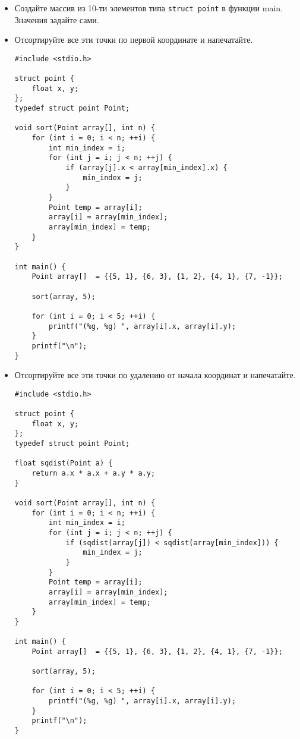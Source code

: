 \documentclass{article}
\begin{document}
\begin{itemize}
\begin{itemize}
\end{itemize}
\item Создайте массив из 10-ти элементов типа \texttt{struct point} в функции main. Значения задайте сами.

\newpage
\item Отсортируйте все эти точки по первой координате и напечатайте.
\begin{lstlisting}[backgroundcolor = \color{solcolor}]
#include <stdio.h>

struct point {
    float x, y;
};
typedef struct point Point;

void sort(Point array[], int n) {
    for (int i = 0; i < n; ++i) {
        int min_index = i;
        for (int j = i; j < n; ++j) {
            if (array[j].x < array[min_index].x) {
                min_index = j;
            }
        }
        Point temp = array[i];
        array[i] = array[min_index];
        array[min_index] = temp;
    }
}

int main() {
    Point array[]  = {{5, 1}, {6, 3}, {1, 2}, {4, 1}, {7, -1}};
    
    sort(array, 5);
    
    for (int i = 0; i < 5; ++i) {
        printf("(%g, %g) ", array[i].x, array[i].y);
    }
    printf("\n");
}
\end{lstlisting}

\newpage
\item Отсортируйте все эти точки по удалению от начала координат и напечатайте.
\begin{lstlisting}[backgroundcolor = \color{solcolor}]
#include <stdio.h>

struct point {
    float x, y;
};
typedef struct point Point;

float sqdist(Point a) {
    return a.x * a.x + a.y * a.y;
}

void sort(Point array[], int n) {
    for (int i = 0; i < n; ++i) {
        int min_index = i;
        for (int j = i; j < n; ++j) {
            if (sqdist(array[j]) < sqdist(array[min_index])) {
                min_index = j;
            }
        }
        Point temp = array[i];
        array[i] = array[min_index];
        array[min_index] = temp;
    }
}

int main() {
    Point array[]  = {{5, 1}, {6, 3}, {1, 2}, {4, 1}, {7, -1}};
    
    sort(array, 5);
    
    for (int i = 0; i < 5; ++i) {
        printf("(%g, %g) ", array[i].x, array[i].y);
    }
    printf("\n");
}
\end{lstlisting}


\end{itemize}
\end{document}
